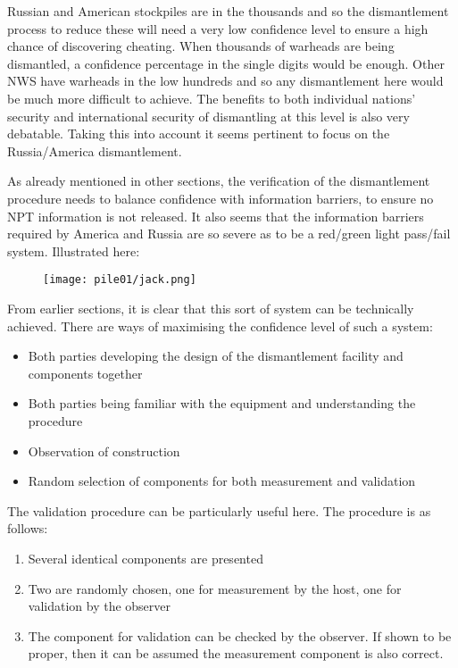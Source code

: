 \documentclass[twoside,titlepage,11pt,twocolumn,a4paper]{article}
\begin{document}
Russian and American stockpiles are in the thousands and so the
dismantlement process to reduce these will need a very low confidence
level to ensure a high chance of discovering cheating. When thousands
of warheads are being dismantled, a confidence percentage in the
single digits would be enough. Other NWS have warheads in the low
hundreds and so any dismantlement here would be much more difficult to
achieve.  The benefits to both individual nations' security and
international security of dismantling at this level is also very
debatable. Taking this into account it seems pertinent to focus on the
Russia/America dismantlement.

As already mentioned in other sections, the verification of the
dismantlement procedure needs to balance confidence with information
barriers, to ensure no NPT information is not released. It also seems
that the information barriers required by America and Russia are so
severe as to be a red/green light pass/fail system. Illustrated here:

\begin{figure}
  \texttt{[image: pile01/jack.png]}
\end{figure}

From earlier sections, it is clear that this sort of system can be
technically achieved. There are ways of maximising the confidence
level of such a system:
\begin{itemize}
  \item Both parties developing the design of the dismantlement
    facility and components together
  \item Both parties being familiar with the equipment and
    understanding the procedure
  \item Observation of construction
  \item Random selection of components for both measurement and
    validation
\end{itemize}

The validation procedure can be particularly useful here. The
procedure is as follows:
\begin{enumerate}
  \item Several identical components are presented
  \item Two are randomly chosen, one for measurement by the host, one
    for validation by the observer
  \item The component for validation can be checked by the
    observer. If shown to be proper, then it can be assumed the
    measurement component is also correct.
\end{enumerate}
\end{document}
